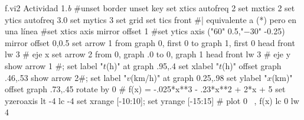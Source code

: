 \begin{plot}{1.1}{f.vi2}
  {Actividad 1.\textit{b}}
  #unset border
  unset key
  set xtics autofreq 2
  set mxtics 2
  set ytics autofreq 3.0
  set mytics 3
  set grid
  set tics front    #| equivalente a (*) pero en una línea
  #set xtics axis mirror offset 1
  #set ytics axis ("$60$" 0.5,"$-30$" -0.25) mirror offset 0,0.5
  set arrow 1 from graph 0, first 0 to graph 1, first 0 head front lw 3 # eje x
  set arrow 2 from 0, graph .0 to 0, graph 1 head front lw 3		# eje y 
  show arrow 1 #; set label "$t$(h)" at graph .95,.4
  set xlabel "$t$(h)" offset  graph .46,.53
  show arrow 2#; set label "$v$(km/h)" at graph 0.25,.98 
  set ylabel "$x$(km)" offset graph .73,.45 rotate by 0
  #
  f(x) = -.025*x**3 - .23*x**2 + 2*x + 5
  set yzeroaxis lt -4 lc -4
  set xrange [-10:10]; set yrange [-15:15]
  #
  plot  0 \
  , f(x) lc 0 lw 4 \
\end{plot}

